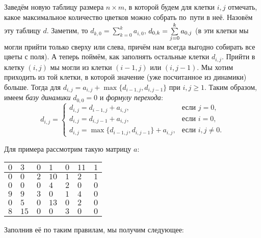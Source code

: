 Заведём новую таблицу размера $n \times m$, в которой будем для клетки $i, j$ отмечать, какое максимальное количество цветков можно собрать по~пути в неё. Назовём эту таблицу $d$. Заметим, то $d_{k, 0} = \sum\limits_{k = 0}^{k}a_{i, 0}$, $d_{0, k} \hm = \sum\limits_{j = 0}^{k}a_{0, j}$ (в эти клетки мы могли прийти только сверху или слева, причём нам всегда выгодно собирать все цветы с поля). А теперь поймём, как заполнять остальные клетки $d_{i, j}$. Прийти в клетку $(i, j)$ мы могли из клетки $(i - 1, j)$ или $(i, j - 1)$. Мы хотим приходить из той клетки, в которой значение (уже посчитанное из динамики) больше. Тогда для $d_{i, j} = a_{i, j} + \max\{d_{i - 1, j}, d_{i, j - 1}\}$ при $i, j \geqslant 1$. Таким образом, имеем \textit{базу динамики} $d_{0, 0} = 0$ и \textit{формулу перехода}:
\[
    d_{i, j} = 
    \begin{cases}
        d_{i, j} = d_{i - 1, j} + a_{i, j},&\text{если $j = 0$},\\
        d_{i, j} = d_{i, j - 1} + a_{i, j},&\text{если $i = 0$},\\
        d_{i, j} = \max\{d_{i - 1, j}, d_{i, j - 1}\} + a_{i, j},&\text{если $i, j \ne 0$}.
    \end{cases}
\]

\noindent
Для примера рассмотрим такую матрицу $a$:

\begin{center}
\begin{tabular}{| C{.6cm} | C{.6cm} | C{.6cm} | C{.6cm} | C{.6cm} | C{.6cm} | C{.6cm} |}
    \hline
    $0$ & $3$ & $0$ & $1$ & $0$ & $11$ & $1$\\
    \hline
    $0$ & $0$ & $2$ & $10$ & $1$ & $2$ & $1$\\
    \hline
    $0$ & $0$ & $0$ & $4$ & $2$ & $0$ & $0$\\
    \hline
    $9$ & $9$ & $3$ & $0$ & $1$ & $4$ & $0$\\
    \hline
    $0$ & $5$ & $0$ & $13$ & $0$ & $2$ & $0$\\
    \hline
    $8$ & $15$ & $0$ & $0$ & $3$ & $0$ & $0$\\
    \hline
\end{tabular}
\end{center}

\noindent
Заполнив её по таким правилам, мы получим следующее:

